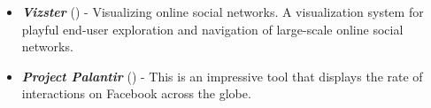 \begin{itemize}
    \item \textit{\textbf{Vizster}} (\cite{heer2005vizster}) - Visualizing online social networks. A visualization system for playful end-user exploration and navigation of large-scale online social networks.
    \item \textit{\textbf{Project Palantir}} (\cite{project-palantir}) - This is an impressive tool that displays the rate of interactions on Facebook across the globe.
\end{itemize}
